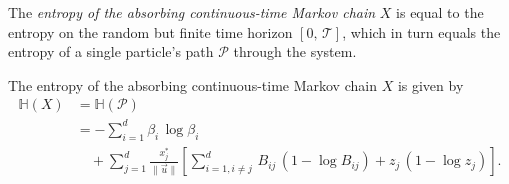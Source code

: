 \documentclass[smallextended]{svjour3}
\newcommand{\TT}{\mathcal{T}}
\renewcommand{\H}{\mathbb{H}}
\newcommand{\suml}{\sum\limits}
\newcommand{\vnorms}[1]{\|#1\|}
\begin{document}
The \emph{entropy of the absorbing continuous-time Markov chain} $X$ is equal to the entropy on the random but finite time horizon $[0,\,\TT]$, which in turn equals the entropy of a single particle's path $\mathcal{P}$ through the system.

\begin{theorem}\label{thm:entropy_of_X}
	The entropy of the absorbing continuous-time Markov chain $X$ is given by
	\begin{equation}
    \label{eqn:H_X}
    \begin{aligned}
      \H(X) &= \H(\mathcal{P})\\
      &= -\suml_{i=1}^d\beta_i\,\log\beta_i\\
      &\quad + \suml_{j=1}^d \frac{x^\ast_j}{\vnorms{\vec{u}}}\left[\suml_{i=1,i\neq j}^d \,B_{ij}\,(1-\log B_{ij}) + z_j\,(1-\log z_j)\right].
    \end{aligned}
	\end{equation}
\end{theorem}
\end{document}
